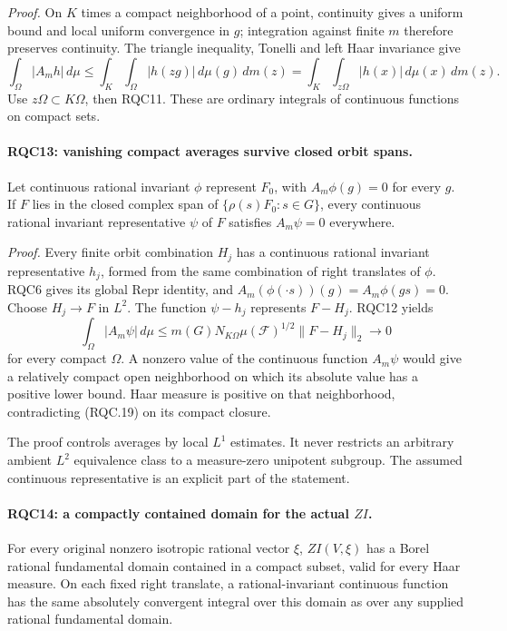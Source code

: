 \documentclass[11pt,a4paper]{article}
\numberwithin{equation}{section}
\theoremstyle{remark}\newtheorem{remark}[theorem]{Remark}
\begin{document}
\emph{Proof.}
On \(K\) times a compact neighborhood of a point, continuity
gives a uniform bound and local uniform convergence in \(g\);
integration against finite \(m\) therefore preserves continuity.
The triangle inequality, Tonelli and left Haar invariance give
\[
 \int_\Omega|A_mh|\,d\mu
 \le\int_K\int_\Omega|h(zg)|\,d\mu(g)\,dm(z)
 =\int_K\int_{z\Omega}|h(x)|\,d\mu(x)\,dm(z).
\]
Use \(z\Omega\subset K\Omega\), then RQC11.
These are ordinary integrals of continuous functions on compact
sets.

\paragraph{RQC13: vanishing compact averages survive closed orbit spans.}
\label{claim:RQC13}
Let continuous rational invariant \(\phi\) represent \(F_0\),
with \(A_m\phi(g)=0\) for every \(g\).
If \(F\) lies in the closed complex span of
\(\{\rho(s)F_0:s\in G\}\), every continuous rational invariant
representative \(\psi\) of \(F\) satisfies \(A_m\psi=0\) everywhere.

\emph{Proof.}
Every finite orbit combination \(H_j\) has a continuous rational
invariant representative \(h_j\), formed from the same combination
of right translates of \(\phi\).  RQC6 gives its global
\(\mathrm{Repr}\) identity, and
\(A_m(\phi(\cdot s))(g)=A_m\phi(gs)=0\).
Choose \(H_j\to F\) in \(L^2\).  The function \(\psi-h_j\)
represents \(F-H_j\).  RQC12 yields
\[
 \int_\Omega|A_m\psi|\,d\mu
 \le m(G)N_{K\Omega}\mu(\mathcal F)^{1/2}\|F-H_j\|_2
 \longrightarrow0
 \tag{RQC.19}
\]
for every compact \(\Omega\).  A nonzero value of the continuous
function \(A_m\psi\) would give a relatively compact open
neighborhood on which its absolute value has a positive lower
bound.  Haar measure is positive on that neighborhood, contradicting
(RQC.19) on its compact closure.

The proof controls averages by local \(L^1\) estimates.  It never
restricts an arbitrary ambient \(L^2\) equivalence class to a
measure-zero unipotent subgroup.  The assumed continuous
representative is an explicit part of the statement.

\paragraph{RQC14: a compactly contained domain for the actual \(ZI\).}
\label{claim:RQC14}
For every original nonzero isotropic rational vector \(\xi\),
\(ZI(V,\xi)\) has a Borel rational fundamental domain contained
in a compact subset, valid for every Haar measure.  On each fixed
right translate, a rational-invariant continuous function has the
same absolutely convergent integral over this domain as over any
supplied rational fundamental domain.
\end{document}
